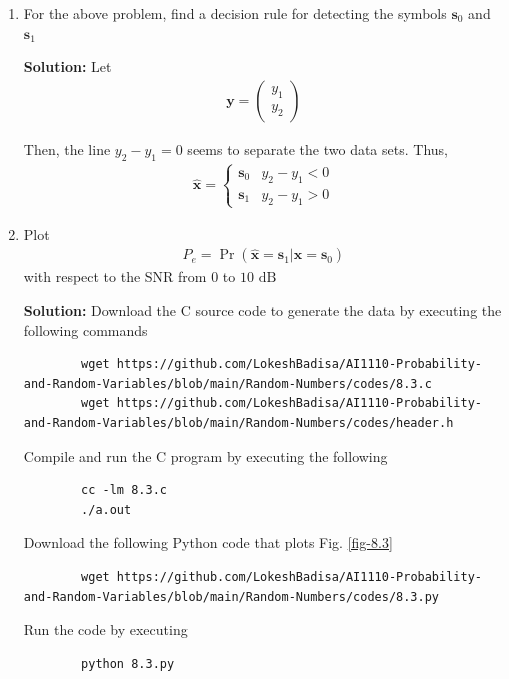 \documentclass[journal,12pt,twocolumn]{IEEEtran}
\newcommand{\solution}{\noindent \textbf{Solution: }}
\providecommand{\pr}[1]{\ensuremath{\Pr\left(#1\right)}}
\providecommand{\mbf}{\mathbf}
\let\vec\mathbf
\numberwithin{equation}{section}
\renewcommand\thesection{\arabic{section}}
\newcommand{\myvec}[1]{\ensuremath{\begin{pmatrix}#1\end{pmatrix}}}
\begin{document}
\begin{enumerate}[label=\thesection.\arabic*,ref=\thesection.\theenumi]
	\item For the above problem, find a decision rule for detecting the symbols $\mbf{s}_0 $ and $\mbf{s}_1$
	
	\solution Let
	\begin{align}
		\vec{y} = \myvec{y_1 \\ y_2}
	\end{align}
	
	Then, the line $y_2 - y_1 = 0$ seems to separate the two data sets. Thus,
	\begin{align}
		\hat{\vec{x}} = 
		\begin{cases}
			\vec{s}_0 & y_2 - y_1 < 0 \\
			\vec{s}_1 & y_2 - y_1 > 0
		\end{cases}
	\end{align}
	
	\item Plot 
	\begin{align} 
		P_e = \pr{\hat{\vec{x}} = \vec{s}_1|\vec{x} = \vec{s}_0}
	\end{align}
	with respect to the SNR from $0$ to $10$ $\mathrm{dB}$
	
	\solution Download the C source code to generate the data by executing the following commands
	\begin{lstlisting}
		wget https://github.com/LokeshBadisa/AI1110-Probability-and-Random-Variables/blob/main/Random-Numbers/codes/8.3.c
		wget https://github.com/LokeshBadisa/AI1110-Probability-and-Random-Variables/blob/main/Random-Numbers/codes/header.h
	\end{lstlisting}
	Compile and run the C program by executing the following
	\begin{lstlisting}
		cc -lm 8.3.c
		./a.out
	\end{lstlisting}
	
	Download the following Python code that plots Fig. \ref{fig-8.3} 
	\begin{lstlisting}
		wget https://github.com/LokeshBadisa/AI1110-Probability-and-Random-Variables/blob/main/Random-Numbers/codes/8.3.py
	\end{lstlisting}
	Run the code by executing
	\begin{lstlisting}
		python 8.3.py
	\end{lstlisting}
	

\end{enumerate}
\end{document}
